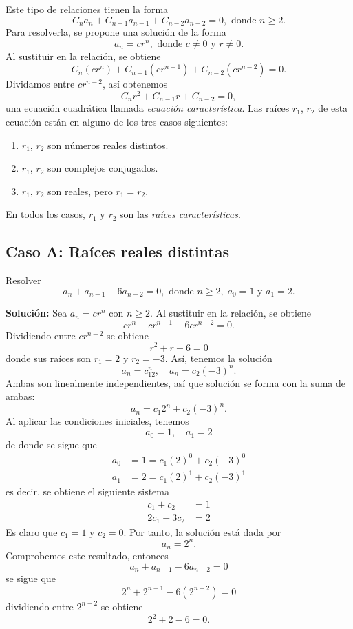 Este tipo de relaciones tienen la forma
$$C_n a_n + C_{n-1} a_{n-1} + C_{n-2} a_{n-2} = 0, \text{ donde } n \geq 2.$$
Para resolverla, se propone una solución de la forma
$$a_n = cr^{n}, \text{ donde } c \neq 0 \text{ y } r \neq 0.$$
Al sustituir en la relación, se obtiene
$$C_n(cr^{n}) + C_{n-1} (cr^{n-1}) + C_{n-2} (cr^{n-2}) = 0.$$
Dividamos entre $cr^{n-2}$, así obtenemos
$$C_n r^{2} + C_{n-1} r + C_{n-2} = 0,$$
una ecuación cuadrática llamada \textit{ecuación característica}. Las raíces $r_1$, $r_2$ de esta ecuación están en alguno de los tres casos siguientes:
\begin{enumerate}[label=\alph*)]
    \item $r_1$, $r_2$ son números reales distintos.
    \item $r_1$, $r_2$ son complejos conjugados.
    \item $r_1$, $r_2$ son reales, pero $r_1 = r_2$.
\end{enumerate}
En todos los casos, $r_1$ y $r_2$ son las \textit{raíces características}.

\subsection*{Caso A: Raíces reales distintas}

\begin{myexample}
    Resolver
    $$a_n + a_{n-1} - 6a_{n-2} = 0, \text{ donde } n \geq 2, \; a_0 = 1 \text{ y } a_1 = 2.$$
    
    \tcblower
    \textbf{\color{jblueleft}Solución:} Sea $a_n = cr^{n}$ con $n \geq 2$. Al sustituir en la relación, se obtiene
    $$cr^{n} + cr^{n-1} - 6cr^{n-2} = 0.$$
    Dividiendo entre $cr^{n-2}$ se obtiene
    $$r^{2} + r - 6 = 0$$
    donde sus raíces son $r_1 = 2$ y $r_2 = -3$. Así, tenemos la solución
    $$a_n = c_12^{n}, \quad a_n = c_2(-3)^{n}.$$
    Ambas son linealmente independientes, así que solución se forma con la suma de ambas:
    $$a_n = c_1 2^{n} + c_2 (-3)^{n}.$$
    Al aplicar las condiciones iniciales, tenemos
    $$a_0 = 1, \quad a_1 = 2$$
    de donde se sigue que
    \begin{align*}
        a_0 & = 1 = c_1(2)^{0} + c_2(-3)^{0} \\
        a_1 & = 2 = c_1(2)^{1} + c_2(-3)^{1}
    \end{align*}
    es decir, se obtiene el siguiente sistema
    \begin{align*}
        c_1 + c_2 & = 1 \\
        2c_1 - 3c_2 & = 2
    \end{align*}
    Es claro que $c_1 = 1$ y $c_2 = 0$. Por tanto, la solución está dada por
    $$a_n = 2^{n}.$$ Comprobemos este resultado, entonces
    $$a_n + a_{n-1} - 6a_{n-2} = 0$$
    se sigue que
    $$2^{n} + 2^{n-1} - 6(2^{n-2}) = 0$$
    dividiendo entre $2^{n-2}$ se obtiene
    $$2^{2} + 2 - 6 = 0.$$
\end{myexample}

